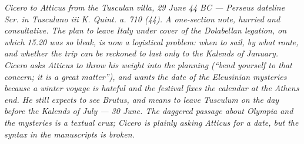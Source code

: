 
\textit{Cicero to Atticus from the Tusculan villa, 29 June 44 BC ---
Perseus dateline \textit{Scr. in Tusculano iii K. Quint. a. 710
(44)}. A one-section note, hurried and consultative. The plan to
leave Italy under cover of the Dolabellan legation, on which 15.20
was so bleak, is now a logistical problem: when to sail, by what
route, and whether the trip can be reckoned to last only to the
Kalends of January. Cicero asks Atticus to throw his weight into
the planning (``bend yourself to that concern; it is a great
matter''), and wants the date of the Eleusinian mysteries because a
winter voyage is hateful and the festival fixes the calendar at the
Athens end. He still expects to see Brutus, and means to leave
Tusculum on the day before the Kalends of July --- 30 June. The
daggered passage about Olympia and the mysteries is a textual
crux; Cicero is plainly asking Atticus for a date, but the syntax
in the manuscripts is broken.}
